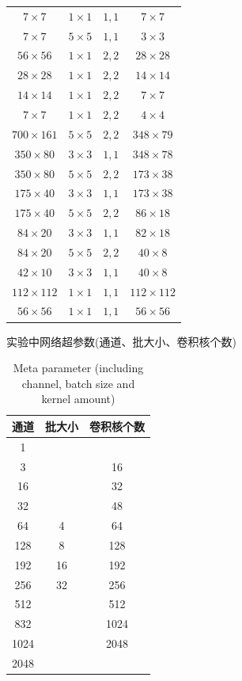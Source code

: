 \begin{table}
\begin{tabular}{cccc}
		$ 7\times 7 $ & $ 1\times 1 $ & $ 1,1 $ & $ 7\times 7 $ \\
		$ 7\times 7 $ & $ 5\times 5 $ & $ 1,1 $ & $ 3\times 3 $ \\
		$ 56\times 56 $ & $ 1\times 1 $ & $ 2,2 $ & $ 28\times 28 $ \\
		$ 28\times 28 $ & $ 1\times 1 $ & $ 2,2 $ & $ 14\times 14 $ \\
		$ 14\times 14 $ & $ 1\times 1 $ & $ 2,2 $ & $ 7\times 7 $ \\
		$ 7\times 7 $ & $ 1\times 1 $ & $ 2,2 $ & $ 4\times 4 $ \\
		$ 700\times 161 $ & $ 5\times 5 $ & $ 2,2 $ & $ 348\times 79 $ \\
		$ 350\times 80 $ & $ 3\times 3 $ & $ 1,1 $ & $ 348\times 78 $ \\
		$ 350\times 80 $ & $ 5\times 5 $ & $ 2,2 $ & $ 173\times 38 $ \\
		$ 175\times 40 $ & $ 3\times 3 $ & $ 1,1 $ & $ 173\times 38 $ \\
		$ 175\times 40 $ & $ 5\times 5 $ & $ 2,2 $ & $ 86\times 18 $ \\
		$ 84\times 20 $ & $ 3\times 3 $ & $ 1,1 $ & $ 82\times 18 $ \\
		$ 84\times 20 $ & $ 5\times 5 $ & $ 2,2 $ & $ 40\times 8 $ \\
		$ 42\times 10 $ & $ 3\times 3 $ & $ 1,1 $ & $ 40\times 8 $ \\
		$ 112\times 112 $ & $ 1\times 1 $ & $ 1,1 $ & $ 112\times 112 $ \\
		$ 56\times 56 $ & $ 1\times 1 $ & $ 1,1 $ & $ 56\times 56 $ \\
		\bottomrule
	\end{tabular} \label{table-CNNMETA} 
\end{table}
\begin{table}
	\centering
	\renewcommand{\thetable}{\arabic{section}-\arabic{table} }
	\renewcommand{\tablename}{表}
	\caption{实验中网络超参数(通道、批大小、卷积核个数)}
	\addtocounter{table}{-1}
	\renewcommand{\thetable}{\arabic{section}-\arabic{table} }
	\renewcommand{\tablename}{Table}
	\caption{Meta parameter (including channel, batch size and kernel amount)}
	\begin{tabular}{ccc}
		\toprule
		通道 & 批大小 & 卷积核个数 \\
		\midrule
		1 & & \\
		3 & & 16 \\
		16 & & 32 \\
		32 & & 48 \\
		64 & 4 & 64 \\
		128 & 8 & 128 \\
		192 & 16 & 192 \\
		256 & 32 & 256 \\
		512 & & 512 \\
		832 & & 1024 \\
		1024 & & 2048\\
		2048 & & \\
		\bottomrule
	\end{tabular} \label{table-CNNMETA1} 
\end{table}
